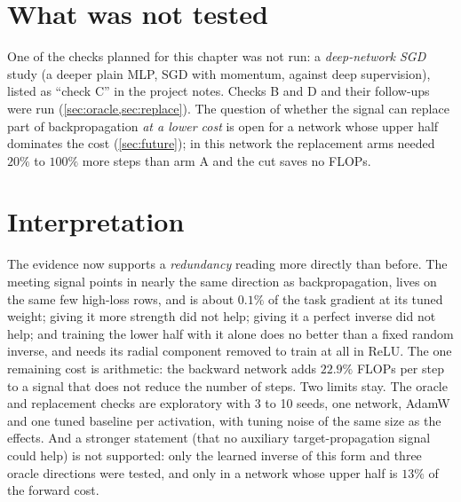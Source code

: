 \section{What was not tested}\label{sec:notrun}
One of the checks planned for this chapter was not run: a \emph{deep-network SGD} study (a deeper plain MLP, SGD with momentum, against deep supervision), listed as ``check C'' in the project notes. Checks B and D and their follow-ups were run (\cref{sec:oracle,sec:replace}). The question of whether the signal can replace part of backpropagation \emph{at a lower cost} is open for a network whose upper half dominates the cost (\cref{sec:future}); in this network the replacement arms needed $20\%$ to $100\%$ more steps than arm A and the cut saves no FLOPs.

\section{Interpretation}
The evidence now supports a \emph{redundancy} reading more directly than before. The meeting signal points in nearly the same direction as backpropagation, lives on the same few high-loss rows, and is about $0.1\%$ of the task gradient at its tuned weight; giving it more strength did not help; giving it a perfect inverse did not help; and training the lower half with it alone does no better than a fixed random inverse, and needs its radial component removed to train at all in ReLU. The one remaining cost is arithmetic: the backward network adds $22.9\%$ FLOPs per step to a signal that does not reduce the number of steps. Two limits stay. The oracle and replacement checks are exploratory with 3 to 10 seeds, one network, AdamW and one tuned baseline per activation, with tuning noise of the same size as the effects. And a stronger statement (that no auxiliary target-propagation signal could help) is not supported: only the learned inverse of this form and three oracle directions were tested, and only in a network whose upper half is $13\%$ of the forward cost.
